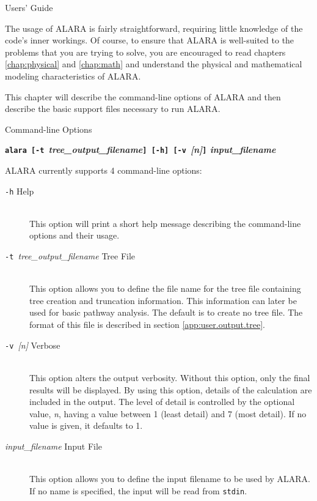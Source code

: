 \addtocounter{tocdepth}{-1}
\begin{chapter}{Users' Guide\label{app:user.guide}}
  
  The usage of ALARA is fairly straightforward, requiring little
  knowledge of the code's inner workings.  Of course, to ensure that
  ALARA is well-suited to the problems that you are trying to solve,
  you are encouraged to read chapters \ref{chap:physical} and
  \ref{chap:math} and understand the physical and mathematical
  modeling characteristics of ALARA.
  
  This chapter will describe the command-line options of ALARA and
  then describe the basic support files necessary to run ALARA.
  
  \begin{section}{Command-line Options}\label{app:user.cmd}
    
    \begin{center}
      \textbf{\texttt{alara [-t }\textsl{tree\_output\_filename}\texttt{]
          [-h] [-v }\textsl{[n]}\texttt{]} \textsl{input\_filename}}
    \end{center}
    ALARA currently supports 4 command-line options:
    \begin{description}
    \item[\texttt{-h} Help]\ \\
      This option will print a short help message describing the
      command-line options and their usage.
    \item[\texttt{-t }\textsl{tree\_output\_filename} Tree File]\ \\
      This option allows you to define the file name for the tree file
      containing tree creation and truncation information.  This
      information can later be used for basic pathway analysis.  The
      default is to create no tree file.  The format of this file is
      described in section \ref{app:user.output.tree}.
    \item[\texttt{-v }\textsl{[n]} Verbose]\ \\
      This option alters the output verbosity.  Without this option,
      only the final results will be displayed.  By using this option,
      details of the calculation are included in the output.  The
      level of detail is controlled by the optional value, \textsl{n},
      having a value between 1 (least detail) and 7 (most detail).  If
      no value is given, it defaults to 1.
    \item[\textsl{input\_filename} Input File]\ \\
      This option allows you to define the input filename to be used
      by ALARA.  If no name is specified, the input will be read from
      \texttt{stdin}.
    \end{description}
    

\end{section}
\end{chapter}
